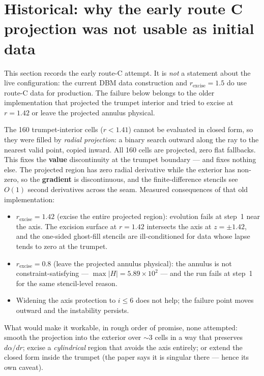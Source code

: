 \documentclass[11pt,openany]{book}
\begin{document}
\section{Historical: why the early route C projection was not usable as initial data}

This section records the early route-C attempt. It is \emph{not} a statement
about the live configuration: the current DBM data construction and
$r_{\mathrm{excise}} = 1.5$ do use route-C data for production. The failure
below belongs to the older implementation that projected the trumpet interior
and tried to excise at $r = 1.42$ or leave the projected annulus physical.

The 160 trumpet-interior cells ($r < 1.41$) cannot be evaluated in closed
form, so they were filled by \emph{radial projection}: a binary search
outward along the ray to the nearest valid point, copied inward. All 160
cells are projected, zero flat fallbacks. This fixes the \textbf{value}
discontinuity at the trumpet boundary --- and fixes nothing else. The
projected region has zero radial derivative while the exterior has non-zero,
so the \textbf{gradient} is discontinuous, and the finite-difference stencils
see $O(1)$ second derivatives across the seam. Measured consequences of that
old implementation:

\begin{itemize}
\item $r_{\mathrm{excise}} = 1.42$ (excise the entire projected region):
      evolution fails at step~1 near the axis. The excision surface at
      $r = 1.42$ intersects the axis at $z = \pm1.42$, and the one-sided
      ghost-fill stencils are ill-conditioned for data whose lapse tends to
      zero at the trumpet.
\item $r_{\mathrm{excise}} = 0.8$ (leave the projected annulus physical):
      the annulus is not constraint-satisfying --- $\max|H| = 5.89\times10^{2}$
      --- and the run fails at step~1 for the same stencil-level reason.
\item Widening the axis protection to $i \leq 6$ does not help; the failure
      point moves outward and the instability persists.
\end{itemize}

What would make it workable, in rough order of promise, none attempted:
smooth the projection into the exterior over $\sim3$ cells in a way that
preserves $d\alpha/dr$; excise a \emph{cylindrical} region that avoids the
axis entirely; or extend the closed form inside the trumpet (the paper says
it is singular there --- hence its own caveat).
\end{document}
